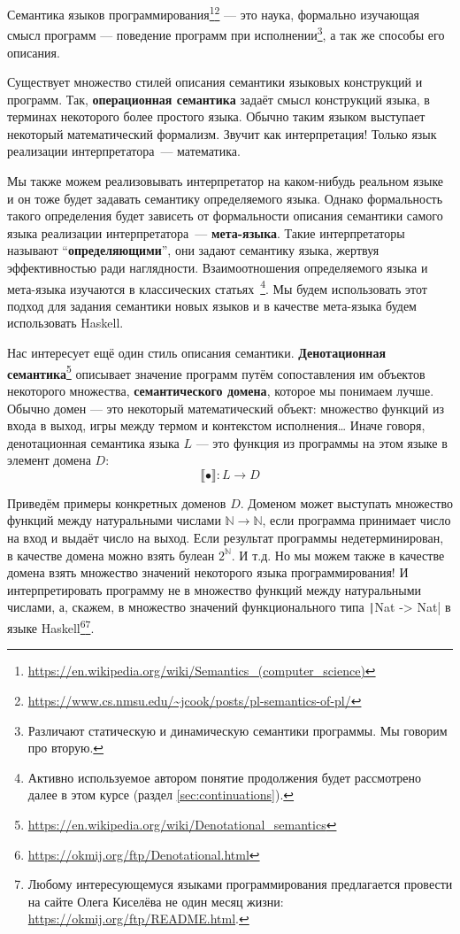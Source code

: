 \documentclass[12pt]{article}
\newcommand{\vocab}[1]{\textbf{#1}} %
\newcommand{\sembr}[1]{\llbracket{#1}\rrbracket} %
\begin{document}
    Семантика языков программирования\footnote{\url{https://en.wikipedia.org/wiki/Semantics_(computer_science)}\label{note:sema-wiki}}\footnote{\url{https://www.cs.nmsu.edu/~jcook/posts/pl-semantics-of-pl/}\label{note:sema-cook}} --- это наука, формально изучающая смысл программ --- поведение программ при исполнении\footnote{Различают статическую и динамическую семантики программы. Мы говорим про вторую.}, а так же способы его описания.

    Существует множество стилей описания семантики языковых конструкций и программ.
    Так, \vocab{операционная семантика} задаёт смысл конструкций языка, в терминах некоторого более простого языка.
    Обычно таким языком выступает некоторый математический формализм.
    Звучит как интерпретация!
    Только язык реализации интерпретатора~--- математика.

    Мы также можем реализовывать интерпретатор на каком-нибудь реальном языке и он тоже будет задавать семантику определяемого языка.
    Однако формальность такого определения будет зависеть от формальности описания семантики самого языка реализации интерпретатора~--- \vocab{мета-языка}.
    Такие интерпретаторы называют ``\vocab{определяющими}'', они задают семантику языка, жертвуя эффективностью ради наглядности.
    Взаимоотношения определяемого языка и мета-языка изучаются в классических статьях~\cite{reynolds1972definitional,reynolds1998definitional}\footnote{Активно используемое автором понятие продолжения будет рассмотрено далее в этом курсе (раздел \ref{sec:continuations}).}.
    Мы будем использовать этот подход для задания семантики новых языков и в качестве мета-языка будем использовать Haskell.

    Нас интересует ещё один стиль описания семантики.
    \vocab{Денотационная семантика}\footnote{\url{https://en.wikipedia.org/wiki/Denotational_semantics}} описывает значение программ путём сопоставления им объектов некоторого множества, \vocab{семантического домена}, которое мы понимаем лучше.
    Обычно домен --- это некоторый математический объект: множество функций из входа в выход, игры между термом и контекстом исполнения\ldots %
    Иначе говоря, денотационная семантика языка $L$ --- это функция из программы на этом языке в элемент домена $D$:
    \[
        \sembr{\bullet} : L \to D
    \]

    Приведём примеры конкретных доменов $D$.
    Доменом может выступать множество функций между натуральными числами $\mathbb{N}\to\mathbb{N}$, если программа принимает число на вход и выдаёт число на выход.
    Если результат программы недетерминирован, в качестве домена можно взять булеан $2^\mathbb{N}$.
    И т.д.
    Но мы можем также в качестве домена взять множество значений некоторого языка программирования!
    И интерпретировать программу не в множество функций между натуральными числами, а, скажем, в множество значений функционального типа \texttt|Nat -> Nat| в языке Haskell\footnote{\url{https://okmij.org/ftp/Denotational.html}}\footnote{Любому интересующемуся языками программирования предлагается провести на сайте Олега Киселёва не один месяц жизни: \url{https://okmij.org/ftp/README.html}.}.
\end{document}
